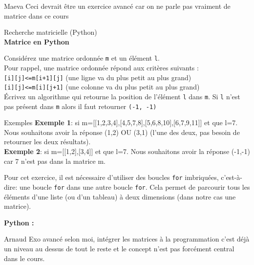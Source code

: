 \begin{note}{Maeva}
    Ceci devrait être un exercice avancé car on ne parle pas vraiment de matrice dans ce cours 
\end{note}
\begin{Exercice}[20 minutes] Recherche matricielle (Python) \optionnel\\
    
    \textbf{Matrice en Python}

    Considérez une matrice ordonnée \lstinline{m} et un élément \lstinline{l}.\\
    
    Pour rappel, une matrice ordonnée répond aux critères suivants :\\
     \lstinline{[i][j]<=m[i+1][j]} (une ligne va du plus petit au plus grand)\\
     \lstinline{[i][j]<=m[i][j+1]} (une colonne va du plus petit au plus grand)\\
 
    
    Écrivez un algorithme qui retourne la position de l’élément \lstinline{l} dans \lstinline{m}. Si \lstinline{l} n’est pas présent dans \lstinline{m} alors il faut retourner \lstinline{(-1, -1)}\\
    
    \begin{Example}{\faTerminal \quad Exemples}
        \textbf{Exemple 1}: si m=[[1,2,3,4],[4,5,7,8],[5,6,8,10],[6,7,9,11]] et que l=7. Nous souhaitons avoir la réponse (1,2) OU (3,1) (l’une des deux, pas besoin de retourner les deux résultats).\\

        \textbf{Exemple 2}: si m=[[1,2],[3,4]] et que l=7. Nous souhaitons avoir la réponse (-1,-1) car 7 n’est pas dans la matrice m.
    \end{Example}

    

    \begin{conseil}
    Pour cet exercice, il est nécessaire d'utiliser des boucles \lstinline{for} imbriquées, c'est-à-dire: une boucle \lstinline{for} dans une autre boucle \lstinline{for}. Cela permet de parcourir tous les éléments d'une liste (ou d'un tableau) à deux dimensions (dans notre cas une matrice). 
    \end{conseil}

    \begin{solution}
        \textbf{Python :}
        
    \end{solution}
  
\begin{note}{Arnaud}
    	Exo avancé selon moi, intégrer les matrices à la programmation c'est déjà un niveau au dessus de tout le reste et le concept n'est pas forcément central dans le cours.
\end{note}

\end{Exercice}

